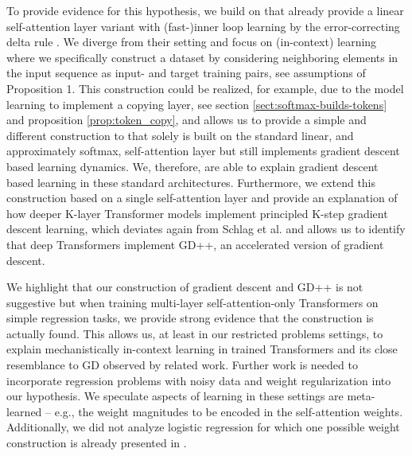 \documentclass{article}
\theoremstyle{plain}
\theoremstyle{definition}
\theoremstyle{remark}
\begin{document}
To provide evidence for this hypothesis, we build on \citet{linear_transformers_fast_weight} that already provide a linear self-attention layer variant with (fast-)inner loop learning by the error-correcting delta rule \cite{widrow:switching}. We diverge from their setting and focus on (in-context) learning where we specifically construct a dataset by considering neighboring elements in the input sequence as input- and target training pairs, see  assumptions of Proposition 1. This construction could be realized, for example, due to the model learning to implement a copying layer, see section \ref{sect:softmax-builds-tokens} and proposition \ref{prop:token_copy}, and allows us to provide a simple and different construction to \citet{linear_transformers_fast_weight} that solely is built on the standard linear, and approximately softmax, self-attention layer but still implements gradient descent based learning dynamics. We, therefore, are able to explain gradient descent based learning in these standard architectures. Furthermore, we extend this construction based on a single self-attention layer and provide an explanation of how deeper K-layer Transformer models implement principled K-step gradient descent learning, which deviates again from Schlag et al. and allows us to identify that deep Transformers implement GD++, an accelerated version of gradient descent.

We highlight that our construction of gradient descent and GD++ is not suggestive but when training multi-layer self-attention-only Transformers on simple regression tasks, we provide strong evidence that the construction is actually found. This allows us, at least in our restricted problems settings, to explain mechanistically in-context learning in trained Transformers and its close resemblance to GD observed by related work. Further work is needed to incorporate regression problems with noisy data and weight regularization into our hypothesis. We speculate aspects of learning in these settings are meta-learned -- e.g., the weight magnitudes to be encoded in the self-attention weights. Additionally, we did not analyze logistic regression for which one possible weight construction is already presented in \citet{hypertransformer}.
\end{document}
